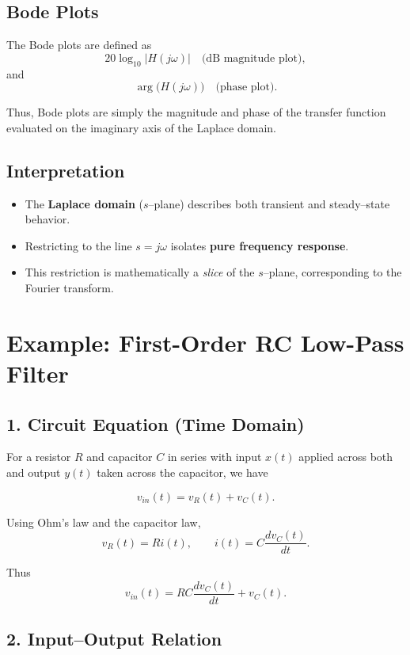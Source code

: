 \documentclass[a4paper,12pt]{article}
\begin{document}
	\subsection*{Bode Plots}
	
	The Bode plots are defined as
	$$
	20 \log_{10} |H(j\omega)| \quad \text{(dB magnitude plot)},
	$$
	and
	$$
	\arg \big( H(j\omega) \big) \quad \text{(phase plot)}.
	$$
	
	Thus, Bode plots are simply the magnitude and phase of the transfer function 
	evaluated on the imaginary axis of the Laplace domain.
	
	\subsection*{Interpretation}
	
	\begin{itemize}
		\item The \textbf{Laplace domain} ($s$--plane) describes both transient and steady--state behavior.
		\item Restricting to the line $s=j\omega$ isolates \textbf{pure frequency response}.
		\item This restriction is mathematically a \emph{slice} of the $s$--plane, corresponding to the Fourier transform.
	\end{itemize}
	
	\section*{Example: First-Order RC Low-Pass Filter}
	
	\subsection*{1. Circuit Equation (Time Domain)}
	
	For a resistor $R$ and capacitor $C$ in series with input $x(t)$ applied across both
	and output $y(t)$ taken across the capacitor, we have
	
	$$
	v_{in}(t) = v_{R}(t) + v_{C}(t).
	$$
	
	Using Ohm’s law and the capacitor law,
	$$
	v_{R}(t) = R i(t), 
	\qquad 
	i(t) = C \frac{dv_{C}(t)}{dt}.
	$$
	
	Thus
	$$
	v_{in}(t) = RC \frac{dv_{C}(t)}{dt} + v_{C}(t).
	$$
	
	\subsection*{2. Input--Output Relation}
	
\end{document}
